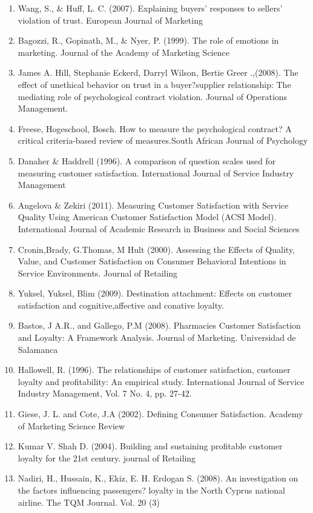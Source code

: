 \documentclass[a4paper, 12pt]{extarticle}
\begin{document}
{\begin{enumerate}
\item Wang, S., \& Huff, L. C. (2007). Explaining buyers' responses to sellers' violation of trust. European Journal of Marketing%
\item Bagozzi, R., Gopinath, M., \& Nyer, P. (1999). The role of emotions in marketing. Journal of the Academy of Marketing Science%
\item James A. Hill, Stephanie Eckerd, Darryl Wilson, Bertie Greer .,(2008). The effect of unethical behavior on trust in a buyer?supplier relationship: The mediating role of psychological contract violation. Journal of Operations Management.%
\item Freese, Hogeschool, Bosch. How to measure the psychological contract? A critical criteria-based review of measures.South African Journal of Psychology
\item Danaher \& Haddrell (1996). A comparison of question scales used for measuring customer satisfaction. International Journal of Service Industry Management
\item  Angelova \& Zekiri (2011). Measuring Customer Satisfaction with Service Quality Using American Customer Satisfaction Model (ACSI Model). International Journal of Academic Research in Business and Social Sciences 
\item Cronin,Brady, G.Thomas, M Hult (2000). Assessing the Effects of Quality, Value, and Customer Satisfaction on Consumer Behavioral Intentions in Service Environments. Journal of Retailing 
\item Yuksel, Yuksel, Blim (2009). Destination attachment: Effects on customer satisfaction and cognitive,affective and conative loyalty.
\item Bastos, J A.R., and Gallego, P.M (2008). Pharmacies Customer Satisfaction and Loyalty: A Framework Analysis. Journal of Marketing. Universidad de Salamanca
\item Hallowell, R. (1996). The relationships of customer satisfaction, customer loyalty and profitability: An empirical study. International Journal of Service Industry Management, Vol. 7 No. 4, pp. 27-42.
\item Giese, J. L. and Cote, J.A (2002). Defining Consumer Satisfaction. Academy of Marketing Science Review
\item Kumar V. Shah D. (2004). Building and sustaining profitable customer loyalty for the 21st century. journal of Retailing
\item Nadiri, H., Hussain, K., Ekiz, E. H. Erdogan S. (2008). An investigation on the factors influencing passengers? loyalty in the North Cyprus national airline. The TQM Journal. Vol. 20 (3)

\end{enumerate}
}
\end{document}
